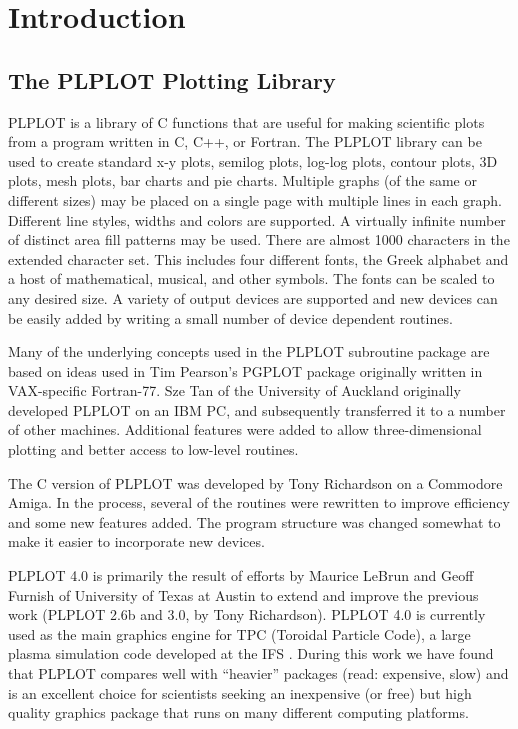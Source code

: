 \chapter {Introduction}
\section {The PLPLOT Plotting Library}

PLPLOT is a library of C functions that are useful for making scientific
plots from a program written in C, C++, or Fortran.  The PLPLOT library can be
used to create standard x-y plots, semilog plots, log-log plots, contour
plots, 3D plots, mesh plots, bar charts and pie charts.  Multiple graphs (of
the same or different sizes) may be placed on a single page with multiple
lines in each graph.  Different line styles, widths and colors are
supported.  A virtually infinite number of distinct area fill patterns may
be used.  There are almost 1000 characters in the extended character set.
This includes four different fonts, the Greek alphabet and a host of
mathematical, musical, and other symbols.  The fonts can be scaled to any
desired size.  A variety of output devices are supported and new
devices can be easily added by writing a small number of device dependent
routines.

Many of the underlying concepts used in the PLPLOT subroutine package
are based on ideas used in Tim Pearson's PGPLOT package originally
written in VAX-specific Fortran-77.  Sze Tan of the University of
Auckland originally developed PLPLOT on an IBM PC, and subsequently
transferred it to a number of other machines.  Additional features were
added to allow three-dimensional plotting and better access to low-level
routines. 

The C version of PLPLOT was developed by Tony Richardson on a Commodore
Amiga.  In the process, several of the routines were rewritten to improve
efficiency and some new features added.  The program structure was changed
somewhat to make it easier to incorporate new devices. 

PLPLOT 4.0 is primarily the result of efforts by Maurice LeBrun and Geoff
Furnish of University of Texas at Austin to extend and improve the previous
work (PLPLOT 2.6b and 3.0, by Tony Richardson).  PLPLOT 4.0 is currently
used as the main graphics engine for TPC (Toroidal Particle Code), a large
plasma simulation code developed at the IFS \cite{lebrun89a}.  During this
work we have found that PLPLOT compares well with ``heavier'' packages
(read: expensive, slow) and is an excellent choice for scientists seeking
an inexpensive (or free) but high quality graphics package that runs on many
different computing platforms.

